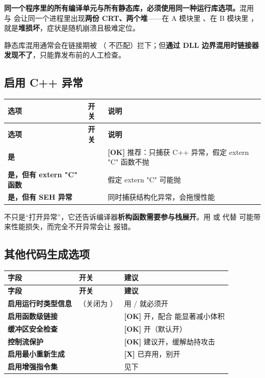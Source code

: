 {{\begin{warnbox}[注意（铁律）]
\textbf{同一个程序里的所有编译单元与所有静态库，必须使用同一种运行库选项。}混用  与  会让同一个进程里出现\textbf{两份 CRT、两个堆}——在 A 模块里 、在 B 模块里 ，就是\textbf{堆损坏}，症状是随机崩溃且极难定位。

静态库混用通常会在链接期被 \textbf{}（ 不匹配）拦下；但\textbf{通过 DLL 边界混用时链接器发现不了}，只能靠发布前的人工检查。
\end{warnbox}

\subsection{启用 C++ 异常}

\begin{longtable}{L{5.6cm}L{2.4cm}L{6.4cm}}
\toprule
\textbf{选项} & \textbf{开关} & \textbf{说明} \\
\midrule
\endfirsthead
\toprule
\textbf{选项} & \textbf{开关} & \textbf{说明} \\
\midrule
\endhead
\bottomrule
\endlastfoot
\textbf{是} &  & \textbf{[OK]} 推荐：只捕获 C++ 异常，假定 extern "C" 函数不抛 \\
\textbf{是，但有 extern "C" 函数} &  & 假定 extern "C" 可能抛 \\
\textbf{是，但有 SEH 异常} &  & 同时捕获结构化异常，会拖慢性能 \\
\end{longtable}

\begin{warnbox}[注意]
 不只是“打开异常”，它还告诉编译器\textbf{析构函数需要参与栈展开}。用  或  代替  可能带来性能损失，而完全不开异常会让  报错。
\end{warnbox}

\subsection{其他代码生成选项}

\begin{longtable}{L{4.6cm}L{3.6cm}L{6.2cm}}
\toprule
\textbf{字段} & \textbf{开关} & \textbf{建议} \\
\midrule
\endfirsthead
\toprule
\textbf{字段} & \textbf{开关} & \textbf{建议} \\
\midrule
\endhead
\bottomrule
\endlastfoot
\textbf{启用运行时类型信息} & （关闭为 ） & 用  /  就必须开 \\
\textbf{启用函数级链接} &  & \textbf{[OK]} 开，配合  能显著减小体积 \\
\textbf{缓冲区安全检查} &  & \textbf{[OK]} 开（默认开） \\
\textbf{控制流保护} &  & \textbf{[OK]} 建议开，缓解劫持攻击 \\
\textbf{启用最小重新生成} &  & \textbf{[X]} 已弃用，别开 \\
\textbf{启用增强指令集} &  & 见下 \\
\end{longtable}

}}
